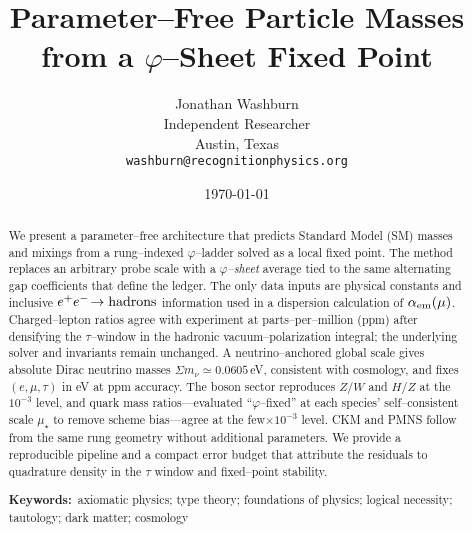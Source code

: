 \documentclass[11pt]{article}
\title{Parameter--Free Particle Masses from a $\varphi$--Sheet Fixed Point}
\author{Jonathan Washburn\\Independent Researcher\\Austin, Texas\\\texttt{washburn@recognitionphysics.org}}
\date{\today}
\newcommand{\keyword}[1]{\textbf{Keywords:}~#1}
\begin{document}
\maketitle

\begin{abstract}
We present a parameter--free architecture that predicts Standard Model (SM) masses and mixings from a rung--indexed $\varphi$--ladder solved as a local fixed point. The method replaces an arbitrary probe scale with a \emph{$\varphi$--sheet} average tied to the same alternating gap coefficients that define the ledger. The only data inputs are physical constants and inclusive $e^+e^-\!\to{\rm hadrons}$ information used in a dispersion calculation of $\alpha_{\rm em}(\mu)$. Charged--lepton ratios agree with experiment at parts--per--million (ppm) after densifying the $\tau$--window in the hadronic vacuum--polarization integral; the underlying solver and invariants remain unchanged. A neutrino--anchored global scale gives absolute Dirac neutrino masses $\Sigma m_\nu\simeq 0.0605$\,eV, consistent with cosmology, and fixes $(e,\mu,\tau)$ in eV at ppm accuracy. The boson sector reproduces $Z/W$ and $H/Z$ at the $10^{-3}$ level, and quark mass ratios—evaluated ``$\varphi$--fixed'' at each species' self--consistent scale $\mu_\star$ to remove scheme bias—agree at the few$\times 10^{-3}$ level. CKM and PMNS follow from the same rung geometry without additional parameters. We provide a reproducible pipeline and a compact error budget that attribute the residuals to quadrature density in the $\tau$ window and fixed--point stability.


\keyword{axiomatic physics; type theory; foundations of physics; logical necessity; tautology; dark matter; cosmology} 




\end{abstract}
\end{document}
